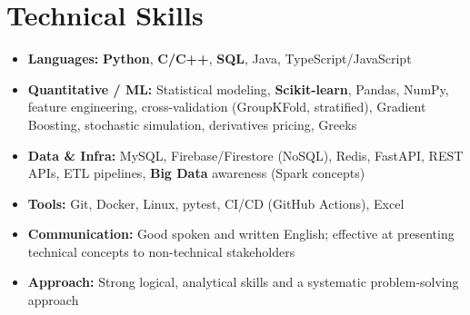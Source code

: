 \documentclass[a4paper,10pt]{article}
\begin{document}
\section{Technical Skills}
\small
\begin{itemize}[label={}]
  \item \textbf{Languages:} \textbf{Python}, \textbf{C/C++}, \textbf{SQL}, Java, TypeScript/JavaScript
  \item \textbf{Quantitative / ML:} Statistical modeling, \textbf{Scikit-learn}, Pandas, NumPy, feature engineering, cross-validation (GroupKFold, stratified), Gradient Boosting, stochastic simulation, derivatives pricing, Greeks
  \item \textbf{Data \& Infra:} MySQL, Firebase/Firestore (NoSQL), Redis, FastAPI, REST APIs, ETL pipelines, \textbf{Big Data} awareness (Spark concepts)
  \item \textbf{Tools:} Git, Docker, Linux, pytest, CI/CD (GitHub Actions), Excel
  \item \textbf{Communication:} Good spoken and written English; effective at presenting technical concepts to non-technical stakeholders
  \item \textbf{Approach:} Strong logical, analytical skills and a systematic problem-solving approach
\end{itemize}
\end{document}

